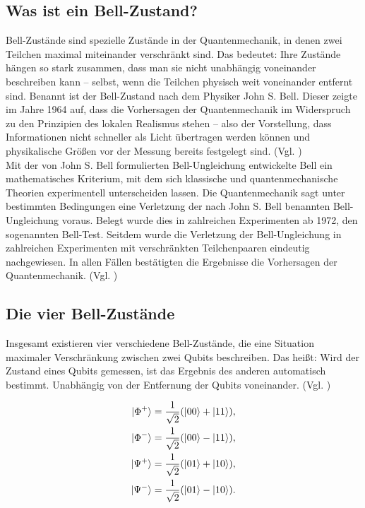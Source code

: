 \subsection{Was ist ein Bell-Zustand?}
Bell-Zustände sind spezielle Zustände in der Quantenmechanik, in denen zwei Teilchen maximal miteinander verschränkt sind. Das bedeutet: Ihre Zustände hängen so stark zusammen, dass man sie nicht unabhängig voneinander beschreiben kann – selbst, wenn die Teilchen physisch weit voneinander entfernt sind. Benannt ist der Bell-Zustand nach dem Physiker John S. Bell. Dieser zeigte im Jahre 1964 auf, dass die Vorhersagen der Quantenmechanik im Widerspruch zu den Prinzipien des lokalen Realismus stehen – also der Vorstellung, dass Informationen nicht schneller als Licht übertragen werden können und physikalische Größen vor der Messung bereits festgelegt sind. (Vgl. \cite[S.195]{bell_einstein_1964})
\\


Mit der von John S. Bell formulierten Bell-Ungleichung entwickelte Bell ein mathematisches Kriterium, mit dem sich klassische und quantenmechanische Theorien experimentell unterscheiden lassen. Die Quantenmechanik sagt unter bestimmten Bedingungen eine Verletzung der nach John S. Bell benannten Bell-Ungleichung voraus. Belegt wurde dies in zahlreichen Experimenten ab 1972, den sogenannten Bell-Test. Seitdem wurde die Verletzung der Bell-Ungleichung in zahlreichen Experimenten mit verschränkten Teilchenpaaren eindeutig nachgewiesen. In allen Fällen bestätigten die Ergebnisse die Vorhersagen der Quantenmechanik. 
(Vgl. \cite[S.53-59]{homeister_quantum_2022})

\subsection{Die vier Bell-Zustände}
Insgesamt existieren vier verschiedene Bell-Zustände, die eine Situation maximaler Verschränkung zwischen zwei Qubits beschreiben. Das heißt: Wird der Zustand eines Qubits gemessen, ist das Ergebnis des anderen automatisch bestimmt. Unabhängig von der Entfernung der Qubits voneinander. (Vgl. \cite[S.53-55]{homeister_quantum_2022}) 

\[
\begin{aligned}
\ket{\Phi^+} &= \frac{1}{\sqrt{2}} (\ket{00} + \ket{11}), \\
\ket{\Phi^-} &= \frac{1}{\sqrt{2}} (\ket{00} - \ket{11}), \\
\ket{\Psi^+} &= \frac{1}{\sqrt{2}} (\ket{01} + \ket{10}), \\
\ket{\Psi^-} &= \frac{1}{\sqrt{2}} (\ket{01} - \ket{10}).
\end{aligned}
\]

